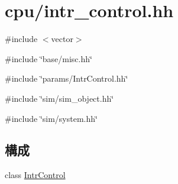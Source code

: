 \hypertarget{intr__control_8hh}{
\section{cpu/intr\_\-control.hh}
\label{intr__control_8hh}
}
{\ttfamily \#include $<$vector$>$}\par
{\ttfamily \#include \char`\"{}base/misc.hh\char`\"{}}\par
{\ttfamily \#include \char`\"{}params/IntrControl.hh\char`\"{}}\par
{\ttfamily \#include \char`\"{}sim/sim\_\-object.hh\char`\"{}}\par
{\ttfamily \#include \char`\"{}sim/system.hh\char`\"{}}\par
\subsection*{構成}
\begin{DoxyCompactItemize}
\item 
class \hyperlink{classIntrControl}{IntrControl}
\end{DoxyCompactItemize}
